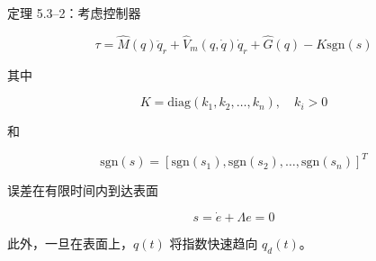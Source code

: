 \documentclass[UTF8,12pt,a4paper]{ctexart}
\begin{document}
\begin{theorem}\label{thm:5.3.2}
定理 5.3--2：考虑控制器

\begin{equation}
\tau = \hat{M}(q)\ddot{q}_r + \hat{V}_m(q, \dot{q})\dot{q}_r + \hat{G}(q) - K \text{sgn}(s)
\end{equation}

其中

\begin{equation}
K = \text{diag}(k_1, k_2, \ldots, k_n), \quad k_i > 0
\end{equation}

和

\begin{equation}
\text{sgn}(s) = [\text{sgn}(s_1), \text{sgn}(s_2), \ldots, \text{sgn}(s_n)]^T
\end{equation}

误差在有限时间内到达表面

\begin{equation}
s = \dot{e} + \Lambda e = 0
\end{equation}

此外，一旦在表面上，$q(t)$ 将指数快速趋向 $q_d(t)$。
\end{theorem}
\end{document}
